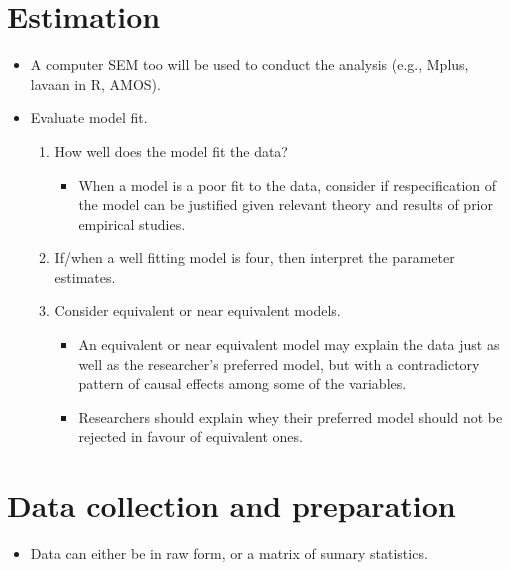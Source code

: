 \documentclass[
  a4paper,
  DIV=11,
  numbers=noendperiod]{scrreprt}
\providecommand{\tightlist}{%
  \setlength{\itemsep}{0pt}\setlength{\parskip}{0pt}}\usepackage{longtable,booktabs,array}
\begin{document}
\section{Estimation}\label{estimation}

\begin{itemize}
\item
  A computer SEM too will be used to conduct the analysis (e.g., Mplus,
  lavaan in R, AMOS).
\item
  Evaluate model fit.

  \begin{enumerate}
  \def\labelenumi{\arabic{enumi}.}
  \tightlist
  \item
    How well does the model fit the data?

    \begin{itemize}
    \tightlist
    \item
      When a model is a poor fit to the data, consider if
      respecification of the model can be justified given relevant
      theory and results of prior empirical studies.
    \end{itemize}
  \item
    If/when a well fitting model is four, then interpret the parameter
    estimates.
  \item
    Consider equivalent or near equivalent models.

    \begin{itemize}
    \tightlist
    \item
      An equivalent or near equivalent model may explain the data just
      as well as the researcher's preferred model, but with a
      contradictory pattern of causal effects among some of the
      variables.
    \item
      Researchers should explain whey their preferred model should not
      be rejected in favour of equivalent ones.
    \end{itemize}
  \end{enumerate}
\end{itemize}

\section{Data collection and
preparation}\label{data-collection-and-preparation}

\begin{itemize}
\tightlist
\item
  Data can either be in raw form, or a matrix of sumary statistics.
\end{itemize}
\end{document}
